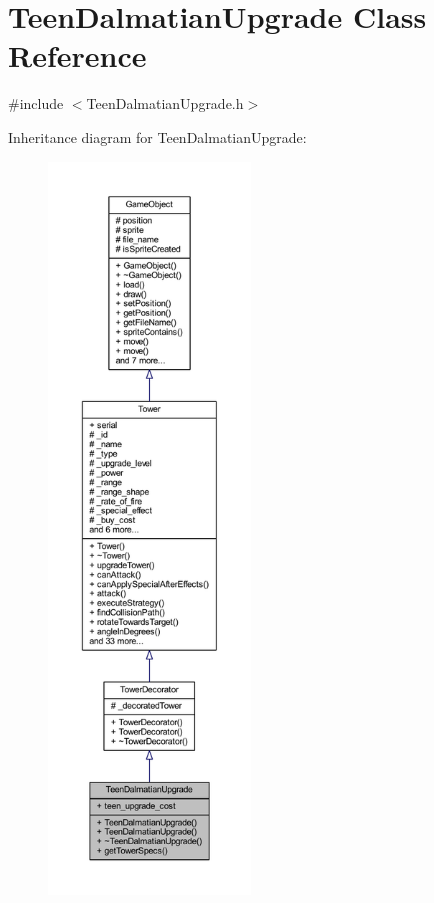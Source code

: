 \hypertarget{class_teen_dalmatian_upgrade}{\section{Teen\+Dalmatian\+Upgrade Class Reference}
\label{class_teen_dalmatian_upgrade}
}


{\ttfamily \#include $<$Teen\+Dalmatian\+Upgrade.\+h$>$}



Inheritance diagram for Teen\+Dalmatian\+Upgrade\+:
\nopagebreak
\begin{figure}[H]
\begin{center}
\leavevmode
\includegraphics[height=550pt]{class_teen_dalmatian_upgrade__inherit__graph}
\end{center}
\end{figure}


